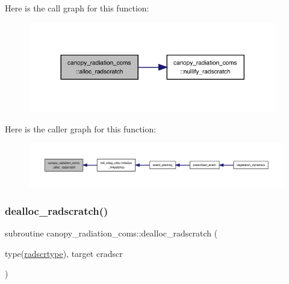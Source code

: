 Here is the call graph for this function\+:
\nopagebreak
\begin{figure}[H]
\begin{center}
\leavevmode
\includegraphics[width=308pt]{namespacecanopy__radiation__coms_abf436863eec6f51fbcad29f1a0ad8833_cgraph}
\end{center}
\end{figure}
Here is the caller graph for this function\+:
\nopagebreak
\begin{figure}[H]
\begin{center}
\leavevmode
\includegraphics[width=350pt]{namespacecanopy__radiation__coms_abf436863eec6f51fbcad29f1a0ad8833_icgraph}
\end{center}
\end{figure}
\mbox{\label{namespacecanopy__radiation__coms_abbcda361926e277937b84aa18b779d72}} 
\subsubsection{\texorpdfstring{dealloc\+\_\+radscratch()}{dealloc\_radscratch()}}
{\footnotesize\ttfamily subroutine canopy\+\_\+radiation\+\_\+coms\+::dealloc\+\_\+radscratch (\begin{DoxyParamCaption}\item[{type(\hyperlink{structcanopy__radiation__coms_1_1radscrtype}{radscrtype}), target}]{cradscr }\end{DoxyParamCaption})}

